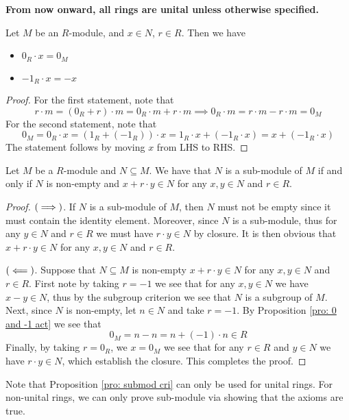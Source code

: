 \textbf{From now onward, all rings are unital unless otherwise specified.}

\begin{pro} \label{pro: 0 and -1 act}
    Let $M$ be an $R$-module, and $x\in N$, $r\in R$. Then we have
    \begin{itemize}
        \item $0_R\cdot x=0_M$
        \item $-1_R\cdot x = -x $
    \end{itemize}
\end{pro}
\begin{proof}
    For the first statement, note that
    \[r\cdot m = (0_R+r)\cdot m = 0_R\cdot m + r\cdot m\implies 0_R\cdot m = r\cdot m - r\cdot m = 0_M\]
    For the second statement, note that
    \[0_M = 0_R\cdot x = (1_R + (-1_R))\cdot x = 1_R\cdot x + (-1_R\cdot x) = x+(-1_R\cdot x)\]
    The statement follows by moving $x$ from LHS to RHS.
\end{proof}

\begin{pro}  \label{pro: submod cri}
    Let $M$ be a $R$-module and $N\subseteq M$. We have that $N$ is a sub-module of $M$ if and only if $N$ is non-empty and $x+r\cdot y\in N$ for any $x,y\in N$ and $r\in R$.
\end{pro}
\begin{proof}
    $\left(\implies\right)$. If $N$ is a sub-module of $M$, then $N$ must not be empty since it must contain the identity element. Moreover, since $N$ is a sub-module, thus for any $y\in N$ and $r\in R$ we must have $r\cdot y\in N$ by closure. It is then obvious that $x+r\cdot y\in N$ for any $x,y\in N$ and $r\in R$.

    $\left(\impliedby\right)$. Suppose that $N\subseteq M$ is non-empty $x+r\cdot y\in N$ for any $x,y\in N$ and $r\in R$. First note by taking $r=-1$ we see that for any $x,y\in N$ we have $x-y\in N$, thus by the subgroup criterion we see that $N$ is a subgroup of $M$. Next, since $N$ is non-empty, let $n\in N$ and take $r=-1$. By Proposition \ref{pro: 0 and -1 act} we see that 
    \[0_M = n -n = n+(-1)\cdot n \in R\]
    Finally, by taking $r=0_R$, we $x=0_M$ we see that for any $r\in R$ and $y\in N$ we have $r\cdot y\in N$, which establish the closure. This completes the proof.
\end{proof}
\begin{re}
    Note that Proposition \ref{pro: submod cri} can only be used for unital rings. For non-unital rings, we can only prove sub-module via showing that the axioms are true.
\end{re}

